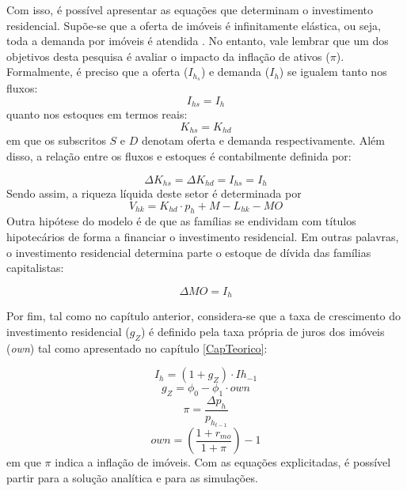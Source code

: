 Com isso, é possível apresentar as equações que determinam o investimento residencial. Supõe-se que a oferta de imóveis é infinitamente elástica, ou seja, toda a demanda por imóveis é atendida \cite[p.~141--145]{duesenberry_investment_1958}. No entanto, vale lembrar que um dos objetivos desta pesquisa é avaliar o impacto da inflação de ativos ($\pi$). Formalmente, é preciso que a oferta ($I_{h_s}$) e demanda ($I_h$) se igualem tanto nos fluxos:
\begin{equation}
    I_{hs} = I_h
\end{equation}
quanto nos estoques em termos reais:
\begin{equation}
    K_{hs} = K_{hd}
\end{equation}
em que os subscritos $S$ e $D$ denotam oferta e demanda respectivamente. Além disso, a relação entre os fluxos e estoques é contabilmente definida por:

\begin{equation}
    \Delta K_{hs} = \Delta K_{hd} = I_{hs} = I_h
\end{equation}
Sendo assim, a riqueza líquida deste setor é determinada por
\begin{equation}
V_{hk} = K_{hd}\cdot p_h + M - L_{hk} - MO
\end{equation}
Outra hipótese do modelo é de que as famílias se endividam com títulos hipotecários de forma a financiar o investimento residencial. Em outras palavras, o investimento residencial determina parte o estoque de dívida das famílias capitalistas:

\begin{equation}
    \label{EqMO}
    \Delta MO = I_h
\end{equation}

Por fim, tal como no capítulo anterior, considera-se que a taxa de crescimento do investimento residencial ($g_Z$) é definido pela taxa própria de juros dos imóveis (\textit{own}) tal como apresentado no capítulo \ref{CapTeorico}:

\begin{equation}
    I_h = (1 + g_Z)\cdot Ih_{-1}
\end{equation}
\begin{equation}
\label{g_Z_own}
g_Z = \phi_0 - \phi_1\cdot own
\end{equation}
$$
\pi = \frac{\Delta p_h}{p_{h_{t-1}}}
$$
\begin{equation}
own = \left(\frac{1+r_{mo}}{1+\pi}\right) -1
\end{equation}
em que $\pi$ indica a inflação de imóveis. 
Com as equações explicitadas, é possível partir para a solução analítica e para as simulações. 
